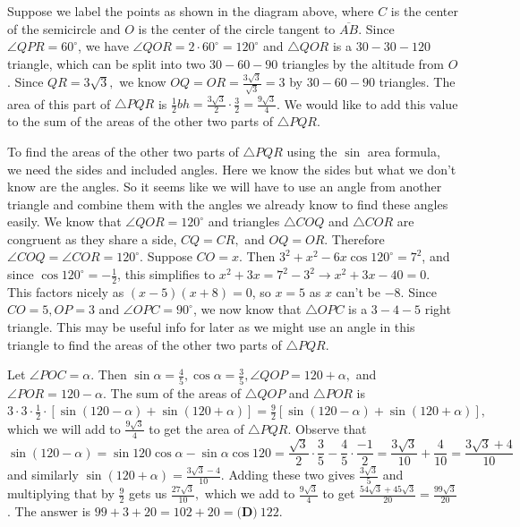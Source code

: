 \begin{enumerate}
 Suppose we label the points as shown in the diagram above, where $C$ is the center of the semicircle and $O$ is the center of the circle tangent to $\overline{AB}$. Since $\angle QPR = 60^{\circ}$, we have $\angle QOR = 2\cdot 60^{\circ}=120^{\circ}$ and $\triangle QOR$ is a $30-30-120$ triangle, which can be split into two $30-60-90$ triangles by the altitude from $O$. Since $QR=3\sqrt{3},$ we know $OQ=OR=\frac{3\sqrt{3}}{\sqrt{3}}=3$ by $30-60-90$ triangles. The area of this part of $\triangle PQR$ is $\frac{1}{2}bh=\frac{3\sqrt{3}}{2}\cdot\frac{3}{2}=\frac{9\sqrt{3}}{4}$. We would like to add this value to the sum of the areas of the other two parts of $\triangle PQR$.

 To find the areas of the other two parts of $\triangle PQR$ using the $\sin$ area formula, we need the sides and included angles. Here we know the sides but what we don't know are the angles. So it seems like we will have to use an angle from another triangle and combine them with the angles we already know to find these angles easily. We know that $\angle QOR = 120^{\circ}$ and triangles $\triangle COQ$ and $\triangle COR$ are congruent as they share a side, $CQ=CR,$ and $OQ=OR$. Therefore $\angle COQ = \angle COR = 120^{\circ}$. Suppose $CO=x$. Then $3^{2}+x^{2}-6x\cos{120^{\circ}}=7^{2}$, and since $\cos{120^{\circ}}=-\frac{1}{2}$, this simplifies to $x^{2}+3x=7^{2}-3^{2}\rightarrow x^{2}+3x-40=0$. This factors nicely as $(x-5)(x+8)=0$, so $x=5$ as $x$ can't be $-8$. Since $CO=5, OP=3$ and $\angle OPC=90^{\circ}$, we now know that $\triangle OPC$ is a $3-4-5$ right triangle. This may be useful info for later as we might use an angle in this triangle to find the areas of the other two parts of $\triangle PQR$.

 Let $\angle POC = \alpha$. Then $\sin\alpha = \frac{4}{5}, \cos\alpha = \frac{3}{5}, \angle QOP = 120+\alpha,$ and $\angle POR = 120-\alpha$. The sum of the areas of $\triangle QOP$ and $\triangle POR$ is $3\cdot 3\cdot\frac{1}{2}\cdot\left[\sin(120-\alpha)+\sin(120+\alpha)\right]=\frac{9}{2}\left[\sin(120-\alpha)+\sin(120+\alpha)\right],$ which we will add to $\frac{9\sqrt{3}}{4}$ to get the area of $\triangle PQR$. Observe that 
 \[\sin(120-\alpha) = \sin 120\cos\alpha-\sin\alpha\cos 120 = \frac{\sqrt{3}}{2}\cdot\frac{3}{5}-\frac{4}{5}\cdot\frac{-1}{2}=\frac{3\sqrt{3}}{10}+\frac{4}{10}=\frac{3\sqrt{3}+4}{10}\]and similarly $\sin(120+\alpha)=\frac{3\sqrt{3}-4}{10}$. Adding these two gives $\frac{3\sqrt{3}}{5}$ and multiplying that by $\frac{9}{2}$ gets us $\frac{27\sqrt{3}}{10},$ which we add to $\frac{9\sqrt{3}}{4}$ to get $\frac{54\sqrt{3}+45\sqrt{3}}{20}=\frac{99\sqrt{3}}{20}$. The answer is $99+3+20=102+20=\boxed{\textbf{(D)} ~122}.$





\end{enumerate}
